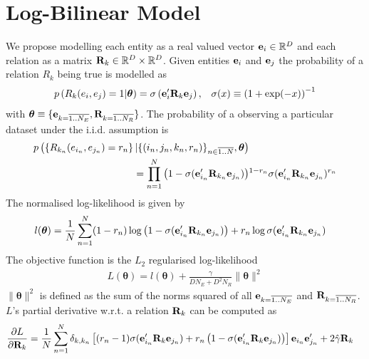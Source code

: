 \documentclass[a4paper, 12pt, fleqn]{article}
\newcommand{\btheta}[0]{\boldsymbol{\theta}}
\begin{document}
\section{Log-Bilinear Model}
We propose modelling each entity as a real valued vector ${\bf e}_i
\in \mathbb{R}^D$ and each relation as a matrix ${\bf R}_k \in
\mathbb{R}^D \times \mathbb{R}^D$. Given entities ${\bf e}_i$ and
${\bf e}_j$ the probability of a relation $R_k$ being true is modelled
as
\begin{align}
  &p\left(R_k(e_i, e_j) = 1\vert \btheta\right) = \sigma\left({\bf
      e}'_i{\bf R}_k{\bf e}_j\right), &\sigma(x) \equiv \left(1 +
    \exp(-x)\right)^{-1}
\end{align}
\noindent with $\btheta \equiv \{{\bf e}_{k=\overline{1..N_E}}, {\bf
  R}_{k=\overline{1..N_R}}\}$. The probability of a observing a
particular dataset under the i.i.d. assumption is
\begin{align}
  \label{eqn:prob_dataset}
  p\left(\left\{R_{k_n}(e_{i_n}, e_{j_n})=r_n\right\}\vert\{(i_n, j_n, k_n,
    r_n)\}_{n\in\overline{1..N}}, \btheta\right)&  \nonumber \\
  = \prod_{n=1}^{N}\left(1 - \sigma({\bf e}'_{i_n}{\bf R}_{k_n}{\bf
     e}_{j_n})\right)&^{1 - r_n}\sigma({\bf e}'_{i_n}{\bf R}_{k_n}{\bf
      e}_{j_n})^{r_n}
\end{align}
The normalised log-likelihood is given by
\begin{align}
  \label{eqn:loglike}
  l(\btheta) = \frac{1}{N}\sum_{n=1}^{N}& (1 - r_n)
\log \left(1 - \sigma({\bf e}'_{i_n}{\bf R}_{k_n}{\bf e}_{j_n})\right)
+ r_n \log \sigma({\bf e}'_{i_n}{\bf R}_{k_n}{\bf e}_{j_n})
\end{align}
\noindent The objective function is the $L_2$ regularised log-likelihood
\begin{align}
  \label{eqn:objective}
  L(\btheta) = l(\btheta) +  \frac{\gamma}{DN_E+ D^2N_R} \|\btheta\|^2
\end{align}
\noindent $\|\btheta\|^2$ is defined as the sum of the norms squared of
all ${\bf e}_{k=\overline{1..N_E}}$ and ${\bf
  R}_{k=\overline{1..N_R}}$. $L$'s partial derivative
w.r.t. a relation ${\bf R}_k$ can be computed as
\begin{align}
  \label{eqn:objective}
  \frac{\partial L}{\partial {\bf R}_k} &=
  \frac{1}{N}\sum_{n=1}^{N}\delta_{k,k_n}\left[(r_n - 1)\sigma({\bf
      e}'_{i_n}{\bf R}_{k}{\bf e}_{j_n}) + r_n \left( 1 - \sigma({\bf
        e}'_{i_n}{\bf R}_{k}{\bf e}_{j_n}) \right)\right]
  {\bf e}_{i_n}{\bf e}'_{j_n}+ 2\hat\gamma{\bf R}_k
\end{align}
\end{document}
